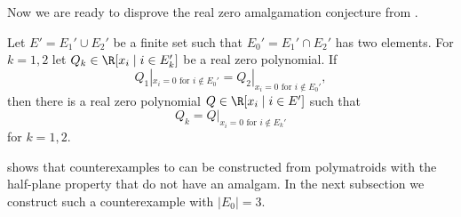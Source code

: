 Now we are ready to disprove the real zero amalgamation conjecture from \cite{rzamalgamation}.

\begin{con}\label{con:weakrzamal}
    Let $E'=E_1'\cup E_2'$ be a finite set such that $E_0'=E_1'\cap E_2'$ has two elements. For $k=1,2$ let $Q_k\in\R[x_i\mid i\in E_k']$ be a real zero polynomial.
    If
    \begin{equation*}
        Q_1|_{x_i=0\textrm{ for }i\not\in E_0'}=Q_2|_{x_i=0\textrm{ for }i\not\in E_0'},
    \end{equation*}
    then there is a real zero polynomial $Q\in\R[x_i\mid i\in E']$ such that 
    \begin{equation*}
     Q_k=Q|_{x_i=0\textrm{ for }i\not\in E_k'}   
    \end{equation*}
     for $k=1,2$.
\end{con}

 shows that counterexamples to  can be constructed from polymatroids with the half-plane property that do not have an amalgam. In the next subsection we construct such a counterexample with $|E_0|=3$.

